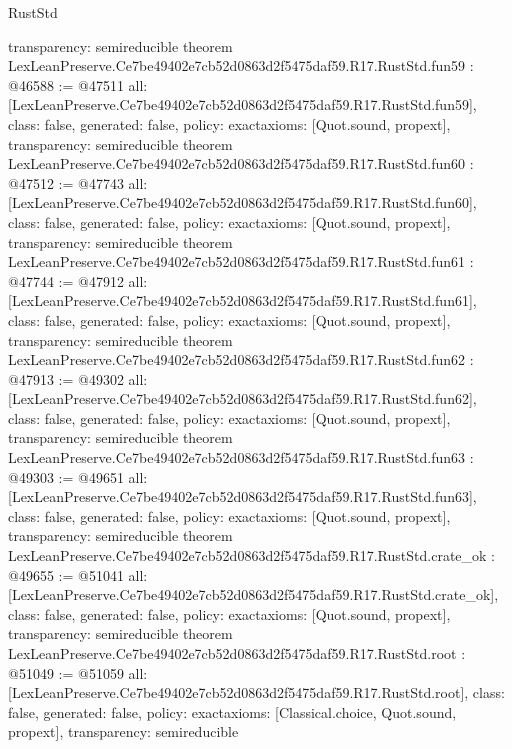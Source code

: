 \begin{lexlean}{RustStd}
\begin{coremodule}
{  transparency: semireducible
}
theorem LexLeanPreserve.Ce7be49402e7cb52d0863d2f5475daf59.R17.RustStd.fun59 : @46588 := @47511 {
  all: [LexLeanPreserve.Ce7be49402e7cb52d0863d2f5475daf59.R17.RustStd.fun59],
  class: false,
  generated: false,
  policy: exact{axioms: [Quot.sound, propext]},
  transparency: semireducible
}
theorem LexLeanPreserve.Ce7be49402e7cb52d0863d2f5475daf59.R17.RustStd.fun60 : @47512 := @47743 {
  all: [LexLeanPreserve.Ce7be49402e7cb52d0863d2f5475daf59.R17.RustStd.fun60],
  class: false,
  generated: false,
  policy: exact{axioms: [Quot.sound, propext]},
  transparency: semireducible
}
theorem LexLeanPreserve.Ce7be49402e7cb52d0863d2f5475daf59.R17.RustStd.fun61 : @47744 := @47912 {
  all: [LexLeanPreserve.Ce7be49402e7cb52d0863d2f5475daf59.R17.RustStd.fun61],
  class: false,
  generated: false,
  policy: exact{axioms: [Quot.sound, propext]},
  transparency: semireducible
}
theorem LexLeanPreserve.Ce7be49402e7cb52d0863d2f5475daf59.R17.RustStd.fun62 : @47913 := @49302 {
  all: [LexLeanPreserve.Ce7be49402e7cb52d0863d2f5475daf59.R17.RustStd.fun62],
  class: false,
  generated: false,
  policy: exact{axioms: [Quot.sound, propext]},
  transparency: semireducible
}
theorem LexLeanPreserve.Ce7be49402e7cb52d0863d2f5475daf59.R17.RustStd.fun63 : @49303 := @49651 {
  all: [LexLeanPreserve.Ce7be49402e7cb52d0863d2f5475daf59.R17.RustStd.fun63],
  class: false,
  generated: false,
  policy: exact{axioms: [Quot.sound, propext]},
  transparency: semireducible
}
theorem LexLeanPreserve.Ce7be49402e7cb52d0863d2f5475daf59.R17.RustStd.crate_ok : @49655 := @51041 {
  all: [LexLeanPreserve.Ce7be49402e7cb52d0863d2f5475daf59.R17.RustStd.crate_ok],
  class: false,
  generated: false,
  policy: exact{axioms: [Quot.sound, propext]},
  transparency: semireducible
}
theorem LexLeanPreserve.Ce7be49402e7cb52d0863d2f5475daf59.R17.RustStd.root : @51049 := @51059 {
  all: [LexLeanPreserve.Ce7be49402e7cb52d0863d2f5475daf59.R17.RustStd.root],
  class: false,
  generated: false,
  policy: exact{axioms: [Classical.choice, Quot.sound, propext]},
  transparency: semireducible
}


\end{coremodule}
\end{lexlean}
